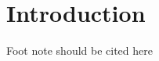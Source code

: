 \chapter{Introduction}



\lipsum[1]
\newpage
\lipsum[5]
\newpage
\lipsum[5]
\newpage
\par
Foot note should be cited here %